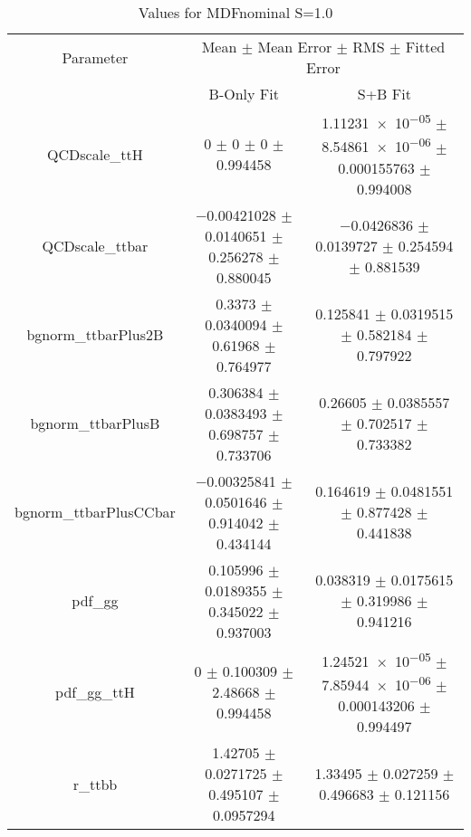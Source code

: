 \begin{table}
\centering
\caption{Values for MDFnominal S=1.0}
\begin{tabular}{ccc}
\toprule
Parameter & \multicolumn{2}{c}{Mean $\pm$ Mean Error $\pm$ RMS $\pm$ Fitted Error}\\
 & B-Only Fit & S+B Fit\\
\midrule
QCDscale\_ttH & \num{0} $\pm$ \num{0} $\pm$ \num{0} $\pm$ \num{0.994458} & \num{1.11231e-05} $\pm$ \num{8.54861e-06} $\pm$ \num{0.000155763} $\pm$ \num{0.994008}\\
QCDscale\_ttbar & \num{-0.00421028} $\pm$ \num{0.0140651} $\pm$ \num{0.256278} $\pm$ \num{0.880045} & \num{-0.0426836} $\pm$ \num{0.0139727} $\pm$ \num{0.254594} $\pm$ \num{0.881539}\\
bgnorm\_ttbarPlus2B & \num{0.3373} $\pm$ \num{0.0340094} $\pm$ \num{0.61968} $\pm$ \num{0.764977} & \num{0.125841} $\pm$ \num{0.0319515} $\pm$ \num{0.582184} $\pm$ \num{0.797922}\\
bgnorm\_ttbarPlusB & \num{0.306384} $\pm$ \num{0.0383493} $\pm$ \num{0.698757} $\pm$ \num{0.733706} & \num{0.26605} $\pm$ \num{0.0385557} $\pm$ \num{0.702517} $\pm$ \num{0.733382}\\
bgnorm\_ttbarPlusCCbar & \num{-0.00325841} $\pm$ \num{0.0501646} $\pm$ \num{0.914042} $\pm$ \num{0.434144} & \num{0.164619} $\pm$ \num{0.0481551} $\pm$ \num{0.877428} $\pm$ \num{0.441838}\\
pdf\_gg & \num{0.105996} $\pm$ \num{0.0189355} $\pm$ \num{0.345022} $\pm$ \num{0.937003} & \num{0.038319} $\pm$ \num{0.0175615} $\pm$ \num{0.319986} $\pm$ \num{0.941216}\\
pdf\_gg\_ttH & \num{0} $\pm$ \num{0.100309} $\pm$ \num{2.48668} $\pm$ \num{0.994458} & \num{1.24521e-05} $\pm$ \num{7.85944e-06} $\pm$ \num{0.000143206} $\pm$ \num{0.994497}\\
r\_ttbb & \num{1.42705} $\pm$ \num{0.0271725} $\pm$ \num{0.495107} $\pm$ \num{0.0957294} & \num{1.33495} $\pm$ \num{0.027259} $\pm$ \num{0.496683} $\pm$ \num{0.121156}\\
\bottomrule
\end{tabular}
\end{table}